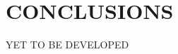 \newpage

\section{\MakeUppercase{Conclusions}}\label{sec:conclusions}

\uppercase{yet to be developed}